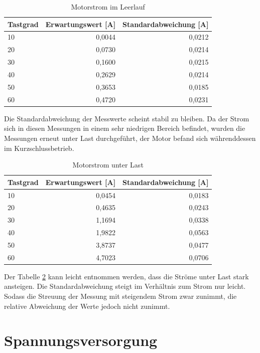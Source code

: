 \begin{table}[H]
  \centering
  \begin{tabularx}{\textwidth}{|X|r|r|}
    \hline
    Tastgrad & Erwartungswert [A] & Standardabweichung [A]  \\ \hline \hline
    10 & 0,0044 & 0,0212\\ \hline
    20 & 0,0730 & 0,0214\\ \hline
    30 & 0,1600 & 0,0215\\ \hline
    40 & 0,2629 & 0,0214\\ \hline
    50 & 0,3653 & 0,0185\\ \hline
    60 & 0,4720 & 0,0231\\ \hline

  \end{tabularx}
  \caption{Motorstrom im Leerlauf}%
  \label{tab:current_noload}
\end{table}

Die Standardabweichung der Messwerte scheint stabil zu bleiben. Da der Strom sich in diesen Messungen in einem sehr niedrigen Bereich befindet, wurden
die Messungen erneut unter Last durchgeführt, der Motor befand sich währenddessen im Kurzschlussbetrieb.

\begin{table}[H]
  \centering
  \begin{tabularx}{\textwidth}{|X|r|r|}
    \hline
    Tastgrad & Erwartungswert [A] & Standardabweichung [A]  \\ \hline \hline
    10 & 0,0454 & 0,0183\\ \hline
    20 & 0,4635 & 0,0243\\ \hline
    30 & 1,1694 & 0,0338\\ \hline
    40 & 1,9822 & 0,0563\\ \hline
    50 & 3,8737 & 0,0477\\ \hline
    60 & 4,7023 & 0,0706\\ \hline
  \end{tabularx}
  \caption{Motorstrom unter Last}%
  \label{tab:current_load}
\end{table}

Der Tabelle \ref{tab:current_load} kann leicht entnommen werden, dass die Ströme unter Last stark ansteigen. Die Standardabweichung steigt im Verhältnis zum Strom nur leicht.
Sodass die Streuung der Messung mit steigendem Strom zwar zunimmt, die relative Abweichung der Werte jedoch nicht zunimmt.


\section{Spannungsversorgung}

